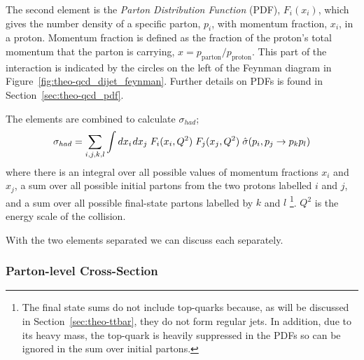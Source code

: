 The second element is the \textit{Parton Distribution Function} (PDF), $F_i(x_i)$,
which gives the number density of a specific parton, $p_i$, with momentum fraction, $x_i$, in a proton.
Momentum fraction is defined as the fraction of the proton's total momentum that the parton is carrying, $x = p_{\text{parton}}/p_{\text{proton}}$.
This part of the interaction is indicated by the circles on the left of the Feynman diagram in Figure~\ref{fig:theo-qcd_dijet_feynman}.
Further details on PDFs is found in Section~\ref{sec:theo-qcd_pdf}.

The elements are combined to calculate $\sigma_{had}$;
\begin{equation}
  \sigma_{had} = \sum_{i,j,k,l} \int dx_i\hspace{0.3mm} dx_j \hspace{1mm} F_i(x_i,Q^2)\hspace{1mm}F_j(x_j,Q^2)\hspace{1mm}\hat{\sigma}(p_i, p_j\to p_k p_l)
\end{equation}
where there is an integral over all possible values of momentum fractions $x_i$ and $x_j$,
a sum over all possible initial partons from the two protons labelled $i$ and $j$,
and a sum over all possible final-state partons labelled by $k$ and $l$
\footnote{The final state sums do not include top-quarks because, as will be discussed in Section~\ref{sec:theo-ttbar}, they do not form regular jets. 
  In addition, due to its heavy mass, the top-quark is heavily suppressed in the PDFs so can be ignored in the sum over initial partons.}.
$Q^2$ is the energy scale of the collision.

\noindent
With the two elements separated we can discuss each separately.

\subsubsection{Parton-level Cross-Section}
\label{sec:theo-qcd_dijet_xs}

